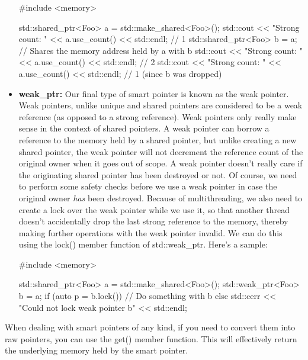 \documentclass{article}
\begin{document}
\begin{itemize}
{    \begin{cpplst}
    #include <memory>

    std::shared_ptr<Foo> a = std::make_shared<Foo>();
    std::cout << "Strong count: " << a.use_count() << std::endl; // 1
    {
        std::shared_ptr<Foo> b = a; // Shares the memory address held by a with b
        std::cout << "Strong count: " << a.use_count() << std::endl; // 2
    }
    std::cout << "Strong count: " << a.use_count() << std::endl; // 1 (since b was dropped)
    \end{cpplst}
}

\item{%
    \textbf{weak\_ptr:} Our final type of smart pointer is known as the weak pointer. Weak pointers, unlike
    unique and shared pointers are considered to be a weak reference (as opposed to a strong reference). Weak
    pointers only really make sense in the context of shared pointers. A weak pointer can borrow a reference
    to the memory held by a shared pointer, but unlike creating a new shared pointer, the weak pointer will
    not decrement the reference count of the original owner when it goes out of scope. A weak pointer doesn't
    really care if the originating shared pointer has been destroyed or not. Of course, we need to perform
    some safety checks before we use a weak pointer in case the original owner \textit{has} been destroyed.
    Because of multithreading, we also need to create a lock over the weak pointer while we use it, so that
    another thread doesn't accidentally drop the last strong reference to the memory, thereby making further
    operations with the weak pointer invalid. We can do this using the lock() member function of
    std::weak\_ptr. Here's a sample:

    \begin{cpplst}
    #include <memory>

    std::shared_ptr<Foo> a = std::make_shared<Foo>();
    {
        std::weak_ptr<Foo> b = a;
        if (auto p = b.lock())
        {
            // Do something with b
        }
        else
        {
            std::cerr << "Could not lock weak pointer b" << std::endl;
        }
    }
    \end{cpplst}
}

\end{itemize}

When dealing with smart pointers of any kind, if you need to convert them into raw pointers, you can use the
get() member function. This will effectively return the underlying memory held by the smart pointer.
\end{document}
